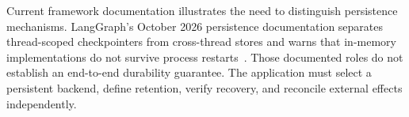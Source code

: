 Current framework documentation illustrates the need to distinguish persistence mechanisms. LangGraph's October 2026 persistence documentation separates thread-scoped checkpointers from cross-thread stores and warns that in-memory implementations do not survive process restarts~\cite{langgraph2026docs}. Those documented roles do not establish an end-to-end durability guarantee. The application must select a persistent backend, define retention, verify recovery, and reconcile external effects independently.

